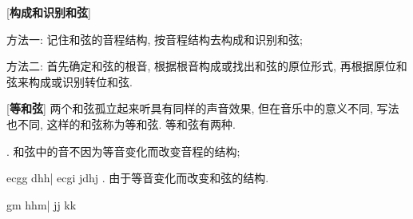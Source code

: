 \clearpage

[\textbf{构成和识别和弦}] \par
\qquad 方法一: 记住和弦的音程结构, 按音程结构去构成和识别和弦;\par
\qquad 方法二: 首先确定和弦的根音, 根据根音构成或找出和弦的原位形式, 再根据原位和弦来构成或识别转位和弦.\par

[\textbf{等和弦}] 两个和弦孤立起来听具有同样的声音效果, 但在音乐中的意义不同, 写法也不同, 这样的和弦称为等和弦. 等和弦有两种.\par
{}. 和弦中的音不因为等音变化而改变音程的结构;\par
\startextract
\Notes \lsh e\sh c\sh g\wh g \lfl d\fl h\wh h\en\bar
\Notes \lsh e\sh c\sh g\wh i \lfl j\fl d\fl h\wh j\en
\zendextract
{}. 由于等音变化而改变和弦的结构.\par
\startextract
\Notes \sh g\wh m \lfl h\lw h\wh m\en\bar
\Notes \sh j\wh j \fl k\wh k\en
\zendextract



